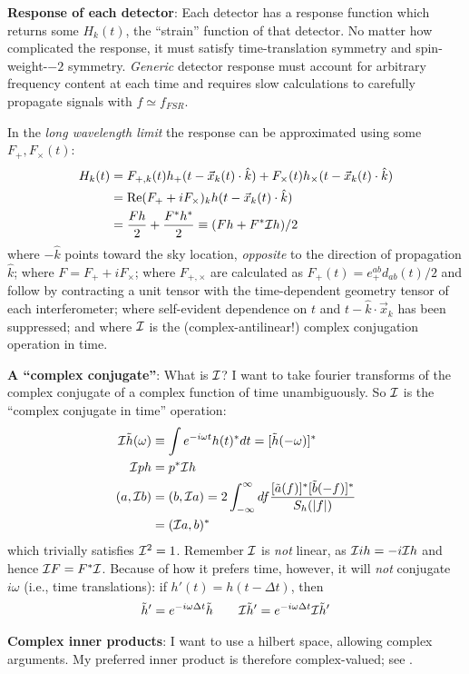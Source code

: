 \documentclass[twocolumn,prd,nofootinbib]{revtex4}
\begin{document}
\noindent \textbf{Response of each detector}: Each detector has a response function which returns some $H_k(t)$, the
``strain'' function of that detector.  No matter how complicated the response, it must satisfy time-translation symmetry and spin-weight-$-2$ symmetry.
 \emph{Generic} detector response must account for arbitrary frequency
content at each time and requires slow calculations to carefully propagate signals with $f\simeq f_{FSR}$.  

In the
\emph{long wavelength limit} the response can be approximated using some $F_+,F_\times(t)$:
\begin{align}
H_k(t) &=F_{+,k}(t) h_+(t-\vec{x}_k(t)\cdot \hat{k}) + F_\times(t) h_\times(t-\vec{x}_k(t)\cdot \hat{k}) \\
 &= \text{Re}(F_++i F_\times)_k h(t-\vec{x}_k(t)\cdot \hat{k}) \\
 &=  \frac{F h }{2} + \frac{F^*h^*}{2} \equiv (Fh  + F^*{\cal I} h)/2
\end{align}
where $-\hat{k}$ points toward the sky location, \emph{opposite} to the direction of propagation $\hat{k}$; where $F=F_++i F_\times$;
where $F_{+,\times}$ are calculated as $F_+(t)=e_+^{ab}d_{ab}(t)/2$ and follow by contracting a unit tensor with the time-dependent geometry tensor of each
interferometer; where self-evident dependence on $t$ and $t-\hat{k}\cdot \vec{x}_k$ has been suppressed; and
where ${\cal I}$ is the (complex-antilinear!) complex conjugation operation in time.   
\begin{shaded}
\noindent \textbf{A ``complex conjugate''}: What is  ${\cal I}$? I want to take fourier transforms of the complex
conjugate of a  complex function of time
unambiguously.  So ${\cal I}$ is the ``complex conjugate in time'' operation:
\begin{align}
{\cal I}\tilde{h}(\omega) &\equiv \int e^{-i\omega t} h(t)^* dt  = [\tilde{h}(-\omega)]^* \\
{\cal I} p h &= p^* {\cal I} h \\
(a,{\cal I} b) & = (b,{\cal I}a) = 2 \int_{-\infty}^{\infty} df \frac{[\tilde{a}(f)]^*[\tilde{b}(-f)]^*}{S_h(|f|)}\\
 &= ({\cal I} a,b)^*
\end{align}
which trivially satisfies ${\cal I}^2=1$.  Remember ${\cal I}$ is \emph{not} linear, as ${\cal I} i h = -i {\cal I} h$
and hence ${\cal I}F=F^*{\cal I}$.  
Because of how it prefers time, however, it will \emph{not} conjugate  $i\omega$ (i.e., time translations):  if $h'(t)=h(t-\Delta t)$, then 
\begin{eqnarray}
\tilde{h}' = e^{-i\omega \Delta t}\tilde{h} \qquad {\cal I}\tilde{h}' = e^{-i\omega \Delta t} {\cal I}\tilde{h}'
\end{eqnarray}


\noindent \textbf{Complex inner products}: I want to use a hilbert space, allowing complex arguments.  My preferred inner product is
therefore complex-valued; see \cite{gwastro-mergers-HeeSuk-FisherMatrixWithAmplitudeCorrections}. 
\end{shaded}
\end{document}
